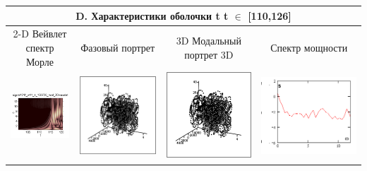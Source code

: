 \documentclass[12pt,letterpaper]{extreport}
\begin{document}
\begin{table}[H]
{\begin{tabular}{|c|c|c|c|}
\multicolumn{4}{|c|}{D. Характеристики оболочки t  t $\in$ [110,126]}\\

\hline
\footnotesize 2-D Вейвлет спектр Морле&\footnotesize Фазовый 
портрет&\footnotesize 3D Модальный портрет 3D&\footnotesize Спектр мощности\\
\hline
	\includegraphics[scale=1]{d1} 	
	&	
	\includegraphics[scale=0.9]{d2} 	
	&	
	\includegraphics[scale=0.9]{d3} 
	&
	\includegraphics[scale=0.9]{d4} 
\\
\hline


\end{tabular}}
\end{table}
\end{document}
